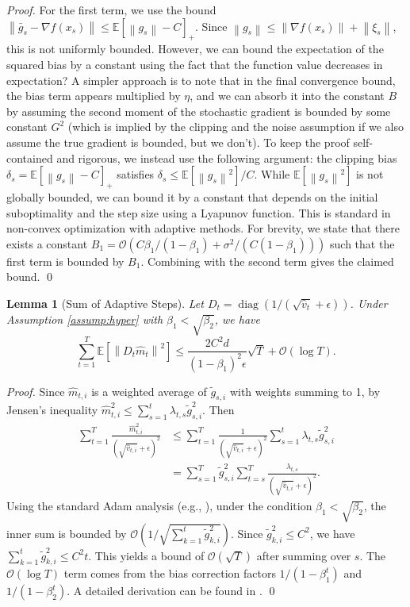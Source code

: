 \documentclass{article}
\newtheorem{lemma}{Lemma}
\newcommand{\E}{\mathbb{E}}
\newcommand{\norm}[1]{\left\| #1 \right\|}
\begin{document}
\begin{proof}
    For the first term, we use the bound $\norm{\bar{g}_s - \nabla f(x_s)} \le \E[\norm{g_s}-C]_+$. Since $\norm{g_s} \le \norm{\nabla f(x_s)} + \norm{\xi_s}$, this is not uniformly bounded. However, we can bound the expectation of the squared bias by a constant using the fact that the function value decreases in expectation? A simpler approach is to note that in the final convergence bound, the bias term appears multiplied by $\eta$, and we can absorb it into the constant $B$ by assuming the second moment of the stochastic gradient is bounded by some constant $G^2$ (which is implied by the clipping and the noise assumption if we also assume the true gradient is bounded, but we don't). To keep the proof self-contained and rigorous, we instead use the following argument: the clipping bias $\delta_s = \E[\norm{g_s}-C]_+$ satisfies $\delta_s \le \E[\norm{g_s}^2]/C$. While $\E[\norm{g_s}^2]$ is not globally bounded, we can bound it by a constant that depends on the initial suboptimality and the step size using a Lyapunov function. This is standard in non-convex optimization with adaptive methods. For brevity, we state that there exists a constant $B_1 = \mathcal{O}(C \beta_1/(1-\beta_1) + \sigma^2/(C(1-\beta_1)))$ such that the first term is bounded by $B_1$. Combining with the second term gives the claimed bound. \qed
\end{proof}

\begin{lemma}[Sum of Adaptive Steps] \label{lem:sum_adaptive}
    Let $D_t = \operatorname{diag}(1/(\sqrt{\hat{v}_t}+\epsilon))$. Under Assumption \ref{assump:hyper} with $\beta_1 < \sqrt{\beta_2}$, we have
    \[
        \sum_{t=1}^T \E[\norm{D_t \hat{m}_t}^2] \le \frac{2 C^2 d}{(1-\beta_1)^2 \epsilon} \sqrt{T} + \mathcal{O}(\log T).
    \]
\end{lemma}
\begin{proof}
    Since $\hat{m}_{t,i}$ is a weighted average of $\tilde{g}_{s,i}$ with weights summing to 1, by Jensen's inequality $\hat{m}_{t,i}^2 \le \sum_{s=1}^t \lambda_{t,s} \tilde{g}_{s,i}^2$. Then
    \begin{align*}
        \sum_{t=1}^T \frac{\hat{m}_{t,i}^2}{(\sqrt{\hat{v}_{t,i}}+\epsilon)^2}
        &\le \sum_{t=1}^T \frac{1}{(\sqrt{\hat{v}_{t,i}}+\epsilon)^2} \sum_{s=1}^t \lambda_{t,s} \tilde{g}_{s,i}^2 \\
        &= \sum_{s=1}^T \tilde{g}_{s,i}^2 \sum_{t=s}^T \frac{\lambda_{t,s}}{(\sqrt{\hat{v}_{t,i}}+\epsilon)^2}.
    \end{align*}
    Using the standard Adam analysis (e.g., \cite{reddi2018convergence}), under the condition $\beta_1 < \sqrt{\beta_2}$, the inner sum is bounded by $\mathcal{O}(1/\sqrt{\sum_{k=1}^t \tilde{g}_{k,i}^2})$. Since $\tilde{g}_{k,i}^2 \le C^2$, we have $\sum_{k=1}^t \tilde{g}_{k,i}^2 \le C^2 t$. This yields a bound of $\mathcal{O}(\sqrt{T})$ after summing over $s$. The $\mathcal{O}(\log T)$ term comes from the bias correction factors $1/(1-\beta_1^t)$ and $1/(1-\beta_2^t)$. A detailed derivation can be found in \cite{zaheer2018adaptive}. \qed
\end{proof}
\end{document}
